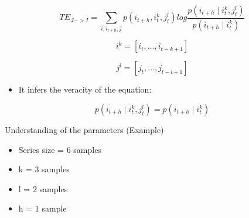 \begin{frame}
	       
    \begin{equation} 
        \label{eq:trans-entropy}
        TE_{{J}->{I}} = \sum_{i,i_{t+h},j} p({i}_{t+h}, {i}_{t}^{k}, {j}_{t}^{l}) log\frac{p({i}_{t+h}\mid {i}_{t}^{k}, {j}_{t}^{l})}{p({i}_{t+h}\mid {i}_{t}^{k})}
        \end{equation} 
        
        \begin{equation}
        \label{eq_ik}
            {i}^{k} =[{i_{t},...,{i}_{t-k+1}}] 
        \end{equation}
        
        \begin{equation}
        \label{eq_jk}
            {j}^{l}=[{j_{t},...,{j}_{t-l+1}}]
        \end{equation}

        \begin{itemize}
            \item It infers the veracity of the equation: 
        \end{itemize}

        

        \begin{equation}
            \label{eq:kullb}
                p({i}_{t+h}\mid {i}_{t}^{k}, {j}_{t}^{l}) =  p({i}_{t+h}\mid {i}_{t}^{k})
        \end{equation}
    
\end{frame}

\begin{frame}
Understanding of the parameters (Example)
    \begin{itemize}
        \item Series size = 6 samples
        \item k = 3 samples
        \item l = 2 samples
        \item h = 1 sample
        
    \end{itemize}
\end{frame}

